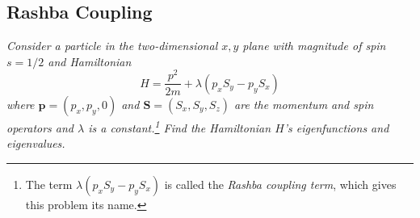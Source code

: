 \documentclass[11pt, a4paper]{article}
\renewcommand{\vec}[1]{\bm{#1}} %
\begin{document}
\subsection{Rashba Coupling}
\textit{Consider a particle in the two-dimensional $ x, y $ plane with magnitude of spin $ s = 1/2 $ and Hamiltonian}
\begin{equation*}
	H = \frac{p^{2}}{2m} + \lambda (p_{x}S_{y} - p_{y}S_{x})
\end{equation*}
\textit{where $ \vec{p} = (p_{x}, p_{y}, 0) $ and $ \vec{S} = (S_{x}, S_{y}, S_{z}) $ are the momentum and spin operators and $ \lambda $ is a constant.\footnote{The term $ \lambda (p_{x}S_{y} - p_{y}S_{x}) $ is called the \textit{Rashba coupling term}, which gives this problem its name.} Find the Hamiltonian $ H $'s eigenfunctions and eigenvalues.}
\end{document}
